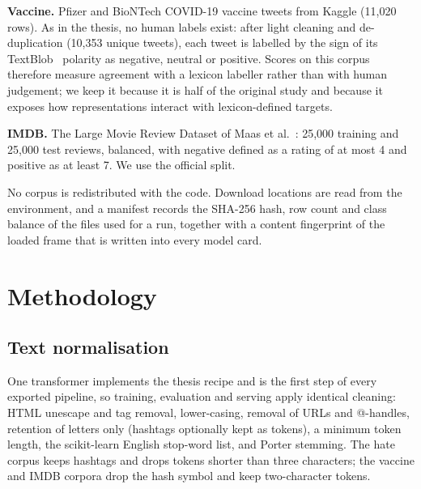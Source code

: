 \documentclass[journal,10pt]{IEEEtran}
\begin{document}
\textbf{Vaccine.} Pfizer and BioNTech COVID-19 vaccine tweets from Kaggle (11,020 rows). As in the thesis, no human labels exist: after light cleaning and de-duplication (10,353 unique tweets), each tweet is labelled by the sign of its TextBlob~\cite{loria2018} polarity as negative, neutral or positive. Scores on this corpus therefore measure agreement with a lexicon labeller rather than with human judgement; we keep it because it is half of the original study and because it exposes how representations interact with lexicon-defined targets.

\textbf{IMDB.} The Large Movie Review Dataset of Maas et al.~\cite{maas2011}: 25,000 training and 25,000 test reviews, balanced, with negative defined as a rating of at most 4 and positive as at least 7. We use the official split.

No corpus is redistributed with the code. Download locations are read from the environment, and a manifest records the SHA-256 hash, row count and class balance of the files used for a run, together with a content fingerprint of the loaded frame that is written into every model card.

\section{Methodology}
\label{sec:method}

\subsection{Text normalisation}
One transformer implements the thesis recipe and is the first step of every exported pipeline, so training, evaluation and serving apply identical cleaning: HTML unescape and tag removal, lower-casing, removal of URLs and @-handles, retention of letters only (hashtags optionally kept as tokens), a minimum token length, the scikit-learn English stop-word list, and Porter stemming. The hate corpus keeps hashtags and drops tokens shorter than three characters; the vaccine and IMDB corpora drop the hash symbol and keep two-character tokens.
\end{document}
